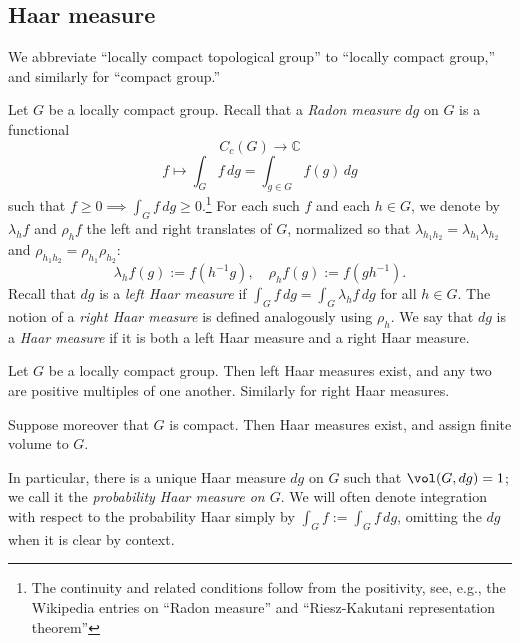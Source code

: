 \documentclass[reqno]{amsart} 
\begin{document}
\subsection{Haar measure}
We abbreviate ``locally compact topological group'' to ``locally compact group,'' and similarly for ``compact group.''
\begin{definition}
  Let $G$ be a locally compact group.  Recall that a \emph{Radon measure} $d g$ on $G$ is a functional
  \begin{equation*}
    C_c(G) \rightarrow \mathbb{C}
  \end{equation*}
  \begin{equation*}
    f \mapsto \int_G f \, d g = \int_{g \in G} f(g) \, d g
  \end{equation*}
  such that $f \geq 0 \implies \int_G f \, d g \geq 0$.\footnote{The continuity and related conditions follow from the positivity, see, e.g., the Wikipedia entries on ``Radon measure'' and ``Riesz-Kakutani representation theorem''}  For each such $f$ and each $h \in G$, we denote by $\lambda_h f$ and $\rho_h f$ the left and right translates of $G$, normalized so that $\lambda_{h_1 h_2} = \lambda_{h_1} \lambda_{h_2}$ and $\rho_{h_1 h_2} = \rho_{h_1} \rho_{h_2}$:
  \begin{equation*}
    \lambda_h f(g) := f(h^{-1} g), \quad \rho_h f(g) := f(g h^{-1}).
  \end{equation*}
  Recall that $d g$ is a \emph{left Haar measure} if $\int_G f \, d g = \int_G \lambda_{h} f \, d g$ for all $h \in G$.  The notion of a \emph{right Haar measure} is defined analogously using $\rho_h$.  We say that $d g$ is a \emph{Haar measure} if it is both a left Haar measure and a right Haar measure.
\end{definition}

\begin{theorem}
  Let $G$ be a locally compact group.  Then left Haar measures exist, and any two are positive multiples of one another.  Similarly for right Haar measures.
  
  Suppose moreover that $G$ is compact.  Then Haar measures exist, and assign finite volume to $G$.
\end{theorem}
In particular, there is a unique Haar measure $d g$ on $G$ such that $\vol(G,d g) = 1$; we call it the \emph{probability Haar measure on $G$}.  We will often denote integration with respect to the probability Haar simply by $\int_G f := \int_G f \, d g$, omitting the $d g$ when it is clear by context.
\end{document}
